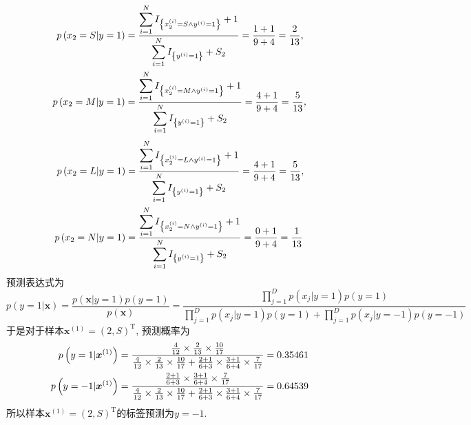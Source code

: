\documentclass{article}
\begin{document}
\begin{homeworkProblem}
\begin{align}
		p\left( x_2=S|y=1 \right) &=\frac{\displaystyle \sum_{i=1}^N{I_{\left\{ x_{2}^{\left( i \right)}=S\land y^{\left( i \right)}=1 \right\}}}+1}{\displaystyle \sum_{i=1}^N{I_{\left\{ y^{\left( i \right)}=1 \right\}}}+S_2}=\frac{1+1}{9+4}=\frac{2}{13}, \notag
		\\
		p\left( x_2=M|y=1 \right) &=\frac{\displaystyle \sum_{i=1}^N{I_{\left\{ x_{2}^{\left( i \right)}=M\land y^{\left( i \right)}=1 \right\}}}+1}{\displaystyle \sum_{i=1}^N{I_{\left\{ y^{\left( i \right)}=1 \right\}}}+S_2}=\frac{4+1}{9+4}=\frac{5}{13}, \notag 
	\end{align}
	\begin{align}
		p\left( x_2=L|y=1 \right) &=\frac{\displaystyle \sum_{i=1}^N{I_{\left\{ x_{2}^{\left( i \right)}=L\land y^{\left( i \right)}=1 \right\}}}+1}{\displaystyle \sum_{i=1}^N{I_{\left\{ y^{\left( i \right)}=1 \right\}}}+S_2}=\frac{4+1}{9+4}=\frac{5}{13}, \notag
		\\
		p\left( x_2=N|y=1 \right) &=\frac{\displaystyle \sum_{i=1}^N{I_{\left\{ x_{2}^{\left( i \right)}=N\land y^{\left( i \right)}=1 \right\}}}+1}{\displaystyle \sum_{i=1}^N{I_{\left\{ y^{\left( i \right)}=1 \right\}}}+S_2}=\frac{0+1}{9+4}=\frac{1}{13} \notag
	\end{align}
	预测表达式为
	$$
	p\left( y=1|\boldsymbol{x} \right) =\frac{p\left( \boldsymbol{x}|y=1 \right) p\left( y=1 \right)}{p\left( \boldsymbol{x} \right)}=\frac{\displaystyle \prod_{j=1}^D{p\left( x_j|y=1 \right)}p\left( y=1 \right)}{\displaystyle \prod_{j=1}^D{p\left( x_j|y=1 \right)}p\left( y=1 \right) +\displaystyle \prod_{j=1}^D{p\left( x_j|y=-1 \right)}p\left( y=-1 \right)}
	$$
	于是对于样本$\boldsymbol{x}^{(1)}=(2,S)^{\text{T}}$, 预测概率为
	\begin{align}
		p\left( y=1|\boldsymbol{x}^{\left( 1 \right)} \right) &=\frac{\frac{4}{12}\times \frac{2}{13}\times \frac{10}{17}}{\frac{4}{12}\times \frac{2}{13}\times \frac{10}{17}+\frac{2+1}{6+3}\times \frac{3+1}{6+4}\times \frac{7}{17}}=0.35461 \notag
		\\
		p\left( y=-1|\boldsymbol{x}^{\left( 1 \right)} \right) &=\frac{\frac{2+1}{6+3}\times \frac{3+1}{6+4}\times \frac{7}{17}}{\frac{4}{12}\times \frac{2}{13}\times \frac{10}{17}+\frac{2+1}{6+3}\times \frac{3+1}{6+4}\times \frac{7}{17}}=0.64539 \notag
	\end{align}
	所以样本$\boldsymbol{x}^{(1)}=(2,S)^{\text{T}}$的标签预测为$y=-1$.


\end{homeworkProblem}
\end{document}
